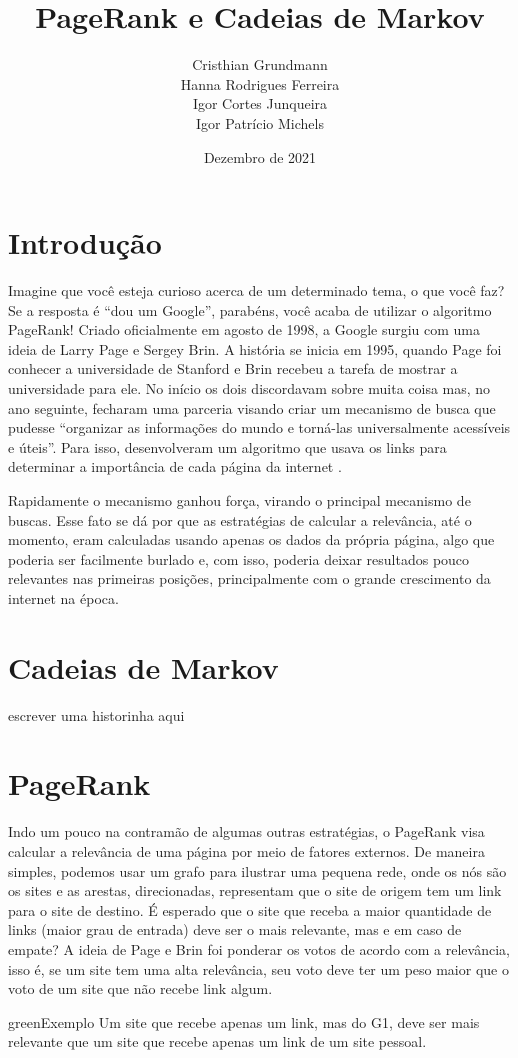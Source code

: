 \documentclass{article}
\title{PageRank e Cadeias de Markov}
\author{Cristhian Grundmann \\
Hanna Rodrigues Ferreira \\
Igor Cortes Junqueira \\
Igor Patrício Michels}
\date{Dezembro de 2021}
\begin{document}
\maketitle

\section*{Introdução}

Imagine que você esteja curioso acerca de um determinado tema, o que você faz? Se a resposta é ``dou um Google'', parabéns, você acaba de utilizar o algoritmo PageRank! Criado oficialmente em agosto de 1998, a Google surgiu com uma ideia de Larry Page e Sergey Brin. A história se inicia em 1995, quando Page foi conhecer a universidade de Stanford e Brin recebeu a tarefa de mostrar a universidade para ele. No início os dois discordavam sobre muita coisa mas, no ano seguinte, fecharam uma parceria visando criar um mecanismo de busca que pudesse ``organizar as informações do mundo e torná-las universalmente acessíveis e úteis''. Para isso, desenvolveram um algoritmo que usava os links para determinar a importância de cada página da internet \cite{google}.

Rapidamente o mecanismo ganhou força, virando o principal mecanismo de buscas. Esse fato se dá por que as estratégias de calcular a relevância, até o momento, eram calculadas usando apenas os dados da própria página, algo que poderia ser facilmente burlado e, com isso, poderia deixar resultados pouco relevantes nas primeiras posições, principalmente com o grande crescimento da internet na época.

\section*{Cadeias de Markov}

escrever uma historinha aqui

\section*{PageRank}

Indo um pouco na contramão de algumas outras estratégias, o PageRank visa calcular a relevância de uma página por meio de fatores externos. De maneira simples, podemos usar um grafo para ilustrar uma pequena rede, onde os nós são os sites e as arestas, direcionadas, representam que o site de origem tem um link para o site de destino. É esperado que o site que receba a maior quantidade de links (maior grau de entrada) deve ser o mais relevante, mas e em caso de empate? A ideia de Page e Brin foi ponderar os votos de acordo com a relevância, isso é, se um site tem uma alta relevância, seu voto deve ter um peso maior que o voto de um site que não recebe link algum.
\begin{mybox}{green}{Exemplo}
    Um site que recebe apenas um link, mas do G1, deve ser mais relevante que um site que recebe apenas um link de um site pessoal.
\end{mybox}
\end{document}

